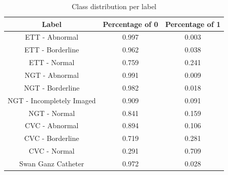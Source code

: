 \documentclass[journal, a4paper]{IEEEtran}
\begin{document}
\begin{table}[ht]
	\centering
	\begin{minipage}{\linewidth}
		\centering
		\begin{tabular}{||c c c||} 
			\hline
			Label                     & Percentage of 0 & Percentage of 1 \\ [0.5ex] 
			\hline\hline
			ETT - Abnormal            & 0.997           & 0.003           \\ \hline
			ETT - Borderline          & 0.962           & 0.038           \\ \hline
			ETT - Normal              & 0.759           & 0.241           \\ \hline
			NGT - Abnormal            & 0.991           & 0.009           \\ \hline
			NGT - Borderline          & 0.982           & 0.018           \\ \hline
			NGT - Incompletely Imaged & 0.909           & 0.091           \\ \hline 
			NGT - Normal              & 0.841           & 0.159           \\ \hline
			CVC - Abnormal            & 0.894           & 0.106           \\ \hline
			CVC - Borderline          & 0.719           & 0.281           \\ \hline
			CVC - Normal              & 0.291           & 0.709           \\ \hline
			Swan Ganz Catheter        & 0.972           & 0.028           \\ [0.5ex] \hline
		\end{tabular}
		\label{tab:classesDistribution}
		\caption{Class distribution per label}
	\end{minipage}
			  
	\bigskip
			  

\end{table}
\end{document}
